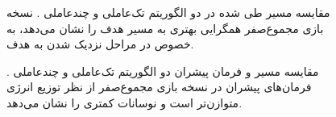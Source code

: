 \begin{figure}[H]
	\centering
	
	
	\caption{
		مقایسه مسیر طی شده در دو الگوریتم تک‌عاملی و چندعاملی .
		نسخه بازی مجموع‌صفر همگرایی بهتری به مسیر هدف را نشان می‌دهد، به خصوص در مراحل نزدیک شدن به هدف.
	}
\end{figure}


\begin{figure}[H]
	\centering
	
	
	\caption{
		مقایسه مسیر و فرمان پیشران دو الگوریتم تک‌عاملی و چندعاملی .
		فرمان‌های پیشران در نسخه بازی مجموع‌صفر از نظر توزیع انرژی متوازن‌تر است و نوسانات کمتری را نشان می‌دهد.
	}
\end{figure}

